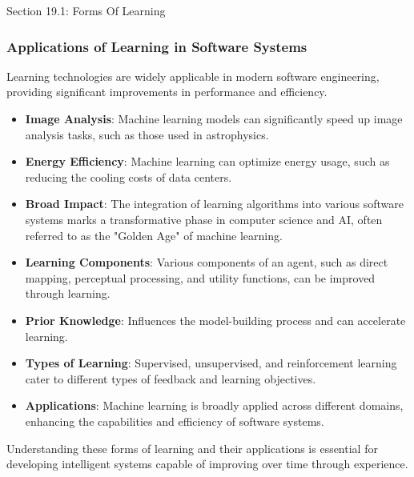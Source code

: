 \begin{notes}{Section 19.1: Forms Of Learning}
\begin{highlight}
    \end{highlight}
    
    \subsubsection*{Applications of Learning in Software Systems}
    
    Learning technologies are widely applicable in modern software engineering, providing significant improvements in performance and efficiency.
    
    \begin{highlight}
    
        \begin{itemize}
            \item \textbf{Image Analysis}: Machine learning models can significantly speed up image analysis tasks, such as those used in astrophysics.
            \item \textbf{Energy Efficiency}: Machine learning can optimize energy usage, such as reducing the cooling costs of data centers.
            \item \textbf{Broad Impact}: The integration of learning algorithms into various software systems marks a transformative phase in computer science and AI, often referred to as the "Golden Age" 
            of machine learning.
        \end{itemize}
    
    \end{highlight}
    
    \begin{highlight}
    
        \begin{itemize}
            \item \textbf{Learning Components}: Various components of an agent, such as direct mapping, perceptual processing, and utility functions, can be improved through learning.
            \item \textbf{Prior Knowledge}: Influences the model-building process and can accelerate learning.
            \item \textbf{Types of Learning}: Supervised, unsupervised, and reinforcement learning cater to different types of feedback and learning objectives.
            \item \textbf{Applications}: Machine learning is broadly applied across different domains, enhancing the capabilities and efficiency of software systems.
        \end{itemize}
    
        Understanding these forms of learning and their applications is essential for developing intelligent systems capable of improving over time through experience.
    
    \end{highlight}
\end{notes}

